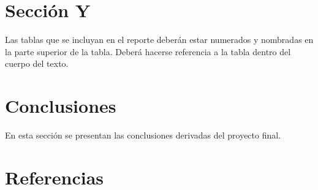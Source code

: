 \documentclass[letterpaper, 12pt]{article}
\begin{document}
\section{Sección Y}
Las tablas que se incluyan en el reporte deberán estar numerados y nombradas en la parte superior de la tabla.  Deberá hacerse referencia a la tabla dentro del cuerpo del texto.

\section{Conclusiones}
En esta sección se presentan las conclusiones derivadas del proyecto final.

\section{Referencias}



\end{document}
